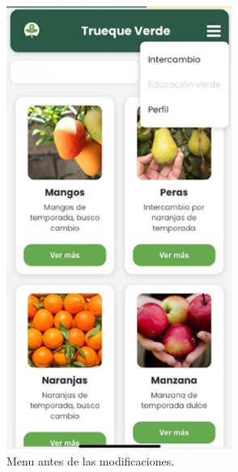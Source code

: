 \documentclass[11pt, a4paper, oneside]{book}
\begin{document}
\begin{figure} [H]
    \centering
    \begin{minipage}{0.45\textwidth}
        \centering
        \includegraphics[width=\textwidth]{Pictures/Imagen4.png}
        \caption{Menu antes de las modificaciones.}
    \end{minipage}

\end{figure}
\end{document}
